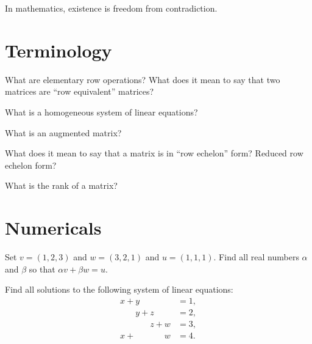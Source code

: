 \documentclass{homework}
\author{Jim Fowler}
\begin{document}
\maketitle

\begin{inspiration}
In mathematics, existence is freedom from contradiction.
\end{inspiration}

\section{Terminology}

\begin{problem}
  What are elementary row operations?  What does it mean to say that
  two matrices are ``row equivalent'' matrices?
\end{problem}

\begin{problem}
  What is a homogeneous system of linear equations?
\end{problem}

\begin{problem}
  What is an augmented matrix?
\end{problem}

\begin{problem}
  What does it mean to say that a matrix is in ``row echelon'' form?  Reduced row echelon form?
\end{problem}

\begin{problem}
  What is the rank of a matrix?
\end{problem}

\section{Numericals}

\begin{problem}
  Set $v = (1,2,3)$ and $w = (3,2,1)$ and $u = (1,1,1)$.  Find all real
  numbers $\alpha$ and $\beta$ so that $\alpha v + \beta w = u$.
\end{problem}

\begin{problem}
  Find all solutions to the following system of linear equations:
  \begin{align*}
    \phantom{}x+y\phantom{+z+w} &= 1, \\
    \phantom{x+}y+z\phantom{+w} &= 2, \\
    \phantom{x+y+}z+w\phantom{} &= 3, \\
    x+\phantom{y+z+}w\phantom{} &= 4. \\    
  \end{align*}
\end{problem}
\end{document}
